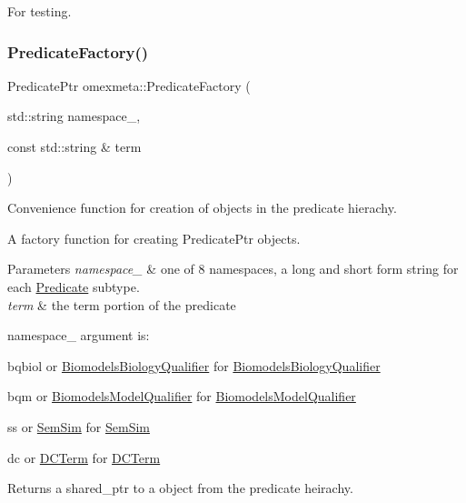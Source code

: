 For testing. \mbox{\label{namespaceomexmeta_a0a8d50daa10e421d0722520cdef0ab9a}} 
\subsubsection{\texorpdfstring{Predicate\+Factory()}{PredicateFactory()}}
{\footnotesize\ttfamily Predicate\+Ptr omexmeta\+::\+Predicate\+Factory (\begin{DoxyParamCaption}\item[{std\+::string}]{namespace\+\_\+,  }\item[{const std\+::string \&}]{term }\end{DoxyParamCaption})}



Convenience function for creation of objects in the predicate hierachy. 

A factory function for creating Predicate\+Ptr objects.


\begin{DoxyParams}{Parameters}
{\em namespace\+\_\+} & one of 8 namespaces, a long and short form string for each \hyperlink{classomexmeta_1_1Predicate}{Predicate} subtype. \\
\hline
{\em term} & the term portion of the predicate\\
\hline
\end{DoxyParams}
namespace\+\_\+ argument is\+:
\begin{DoxyItemize}
\item bqbiol or \hyperlink{classomexmeta_1_1BiomodelsBiologyQualifier}{Biomodels\+Biology\+Qualifier} for \hyperlink{classomexmeta_1_1BiomodelsBiologyQualifier}{Biomodels\+Biology\+Qualifier}
\item bqm or \hyperlink{classomexmeta_1_1BiomodelsModelQualifier}{Biomodels\+Model\+Qualifier} for \hyperlink{classomexmeta_1_1BiomodelsModelQualifier}{Biomodels\+Model\+Qualifier}
\item ss or \hyperlink{classomexmeta_1_1SemSim}{Sem\+Sim} for \hyperlink{classomexmeta_1_1SemSim}{Sem\+Sim}
\item dc or \hyperlink{classomexmeta_1_1DCTerm}{D\+C\+Term} for \hyperlink{classomexmeta_1_1DCTerm}{D\+C\+Term}
\end{DoxyItemize}

\begin{DoxyReturn}{Returns}
a shared\+\_\+ptr to a object from the predicate heirachy. 
\end{DoxyReturn}
